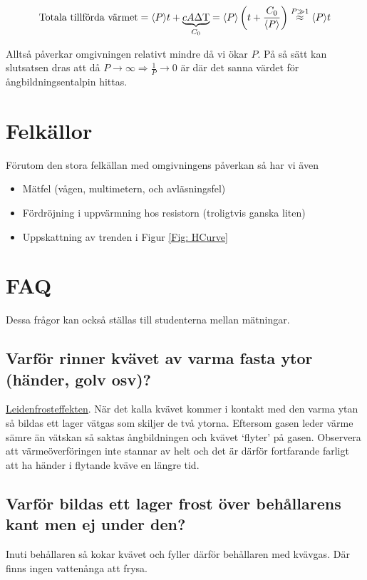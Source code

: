 \documentclass[11pt]{article}
\begin{document}
\begin{equation*}
    \text{Totala tillförda värmet} = \langle P \rangle t + \underbrace{ c A \Delta \text T }_{C_0} = \langle P \rangle \left (t + \frac{C_0}{\langle P \rangle} \right ) \stackrel{P \gg 1}{\approx} \langle P \rangle t
\end{equation*}

Alltså påverkar omgivningen relativt mindre då vi ökar $P$. På så sätt kan slutsatsen dras att då $P \to \infty \Rightarrow \frac{1}{P} \to 0$ är där det sanna värdet för ångbildningsentalpin hittas.

\section{Felkällor}

Förutom den stora felkällan med omgivningens påverkan så har vi även

\begin{itemize}
    \item Mätfel (vågen, multimetern, och avläsningsfel)
    \item Fördröjning i uppvärmning hos resistorn (troligtvis ganska liten)
    \item Uppskattning av trenden i Figur \ref{Fig: HCurve}
\end{itemize}

\section{FAQ}

Dessa frågor kan också ställas till studenterna mellan mätningar.

\subsection*{Varför rinner kvävet av varma fasta ytor (händer, golv osv)?}

\href{https://en.wikipedia.org/wiki/Leidenfrost_effect}{Leidenfrosteffekten}. När det kalla kvävet kommer i kontakt med den varma ytan så bildas ett lager vätgas som skiljer de två ytorna. Eftersom gasen leder värme sämre än vätskan så saktas ångbildningen och kvävet `flyter' på gasen. Observera att värmeöverföringen inte stannar av helt och det är därför fortfarande farligt att ha händer i flytande kväve en längre tid.

\subsection*{Varför bildas ett lager frost över behållarens kant men ej under den?}

Inuti behållaren så kokar kvävet och fyller därför behållaren med kvävgas. Där finns ingen vattenånga att frysa.
\end{document}
